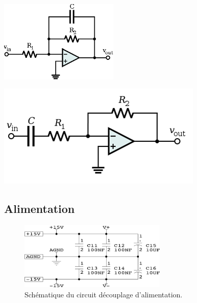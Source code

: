 \documentclass[10pt, oneside, a4paper]{article}
\begin{document}
\begin{minipage}[t]{.475\textwidth}
    \centering
    \includegraphics[height=110pt]{eps/active-lowpass-filter-rc.eps}
    \label{fig:filtreLowpass}
\end{minipage} \hfill
\begin{minipage}[t]{.475\textwidth}
    \centering
    \includegraphics[width=\textwidth]{image/active-highpass-filter-rc.png}
    \label{fig:filtreHighpass}
\end{minipage}

\subsection{Alimentation}
\begin{figure}[!ht]
	\centering
	\includegraphics[width=7cm]{image/sch-alim.png}
	\caption{Schématique du circuit découplage d'alimentation.}
\end{figure}
\end{document}
